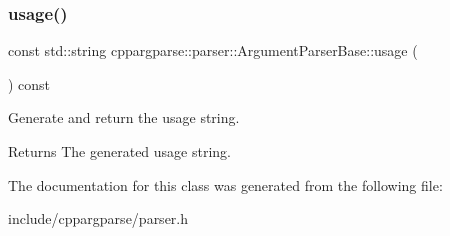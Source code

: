 \subsubsection{\texorpdfstring{usage()}{usage()}}
{\footnotesize\ttfamily const std\+::string cppargparse\+::parser\+::\+Argument\+Parser\+Base\+::usage (\begin{DoxyParamCaption}{ }\end{DoxyParamCaption}) const\hspace{0.3cm}{\ttfamily [inline]}}



Generate and return the usage string. 

\begin{DoxyReturn}{Returns}
The generated usage string. 
\end{DoxyReturn}


The documentation for this class was generated from the following file\+:\begin{DoxyCompactItemize}
\item 
include/cppargparse/parser.\+h\end{DoxyCompactItemize}
